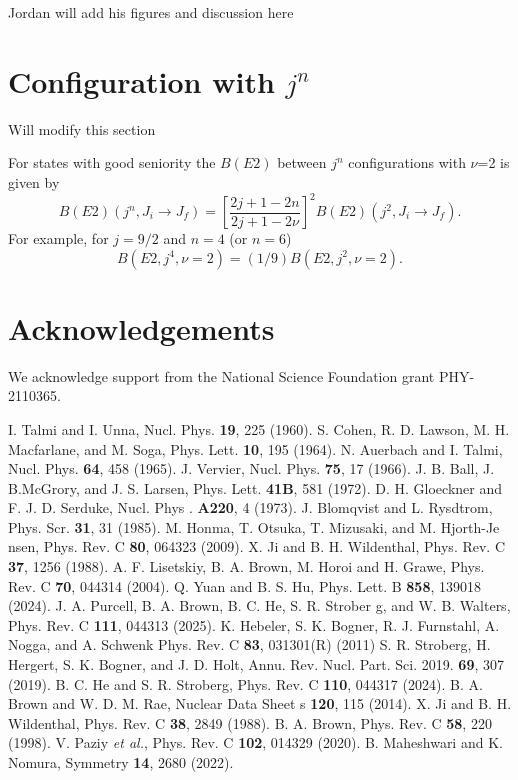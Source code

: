 \documentclass[aps,prl,twocolumn,tightenlines,superscriptaddress,showpacs]{revtex4-1}
\begin{document}
Jordan will add his figures and discussion here




\section{Configuration with $  j^{n}  $}

Will modify this section




For states with good seniority the $  B(E2)  $
between $  j^{n}  $ configurations with $  \nu   $=2 is given by \cite{bh22}
$$
B(E2)(j^{n},J_{i} \rightarrow J_{f})  =
\left[\frac{2j+1-2n}{2j+1-2\nu }\right]^{2} B(E2)(j^{2},J_{i} \rightarrow J_{f}).
$$
For example, for $  j=9/2  $ and $  n=4  $ (or $  n=6  $)
$$
B(E2,j^{4},\nu =2) = (1/9) B(E2,j^{2},\nu =2).
$$



\section{Acknowledgements}


We acknowledge support from the National Science Foundation grant PHY-2110365.



\begin{thebibliography}{9}
 I. Talmi and I. Unna, Nucl. Phys. {\bf 19}, 225 (1960). 
S. Cohen, R. D. Lawson, M. H. Macfarlane, and M. 
Soga, Phys. Lett. {\bf 10}, 195 (1964). 
 N. Auerbach and I. Talmi, Nucl. Phys. {\bf 64}, 458 (1965). 
 J. Vervier, Nucl. Phys. {\bf 75}, 17 (1966). 
J. B. Ball, J. B.McGrory, and J. S. Larsen, Phys. 
Lett. {\bf 41B}, 581 (1972). 
D. H. Gloeckner and F. J. D. Serduke, Nucl. Phys . 
 {\bf A220}, 4 (1973). 
 J. Blomqvist and L. Rysdtrom, Phys. Scr. {\bf 31}, 31 (1985). 
M. Honma, T. Otsuka, T. Mizusaki, and M. Hjorth-Je 
nsen, Phys. Rev. C {\bf 80}, 064323 (2009). 
 X. Ji and B. H. Wildenthal, Phys. Rev. C {\bf 37}, 1256 (1988). 
A. F. Lisetskiy, B. A. Brown, M. Horoi and H. Grawe, 
 Phys. Rev. C {\bf 70}, 044314 (2004). 
 Q. Yuan and B. S. Hu, Phys. Lett. B {\bf 858}, 139018 (2024). 
J. A. Purcell, B. A. Brown, B. C. He, S. R. Strober 
g, and W. B. Walters, 
     Phys. Rev. C {\bf 111}, 044313 (2025). 
K. Hebeler, S. K. Bogner, R. J. Furnstahl, A. Nogga, 
and A. Schwenk Phys. Rev. C {\bf 83}, 031301(R) (2011) 
S. R. Stroberg, H. Hergert, S. K. Bogner, and J. D. 
 Holt, Annu. Rev. Nucl. Part. Sci. 2019. {\bf 69}, 307 (2019). 
B. C. He and S. R. Stroberg, Phys. Rev. C {\bf 110}, 
044317 (2024). 
B. A. Brown and W. D. M. Rae, Nuclear Data Sheet 
s {\bf 120}, 115 (2014). 
 X. Ji and B. H. Wildenthal, Phys. Rev. C {\bf 38}, 2849 (1988). 
 B. A. Brown, Phys. Rev. C {\bf 58}, 220 (1998). 
 V. Paziy {\it et al.}, Phys. Rev. C {\bf 102}, 014329 (2020). 
 B. Maheshwari and K. Nomura, Symmetry {\bf 14}, 2680 (2022). 
\end{thebibliography}
\end{document}
